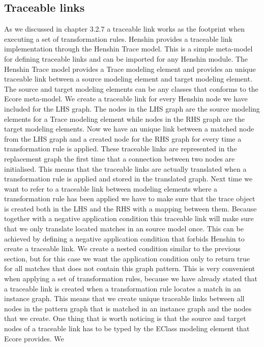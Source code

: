 \subsection{Traceable links}
\label{Trace}

As we discussed in chapter 3.2.7 a traceable link works as the footprint when
executing a set of transformation rules. Henshin provides a traceable link
implementation through the Henshin Trace model. This is a simple meta-model for
defining traceable links and can be imported for any Henshin module. The Henshin
Trace model provides a Trace modeling element and provides an unique traceable
link between a source modeling element and target modeling element. The source
and target modeling elements can be any classes that conforms to the Ecore
meta-model. We create a traceable link for every Henshin node we have included
for the LHS graph. The nodes in the LHS graph are the source modeling elements
for a Trace modeling element while nodes in the RHS graph are the target
modeling elements. Now we have an unique link between a matched node from the
LHS graph and a created node for the RHS graph for every time a transformation
rule is applied. These traceable links are represented in the replacement graph
the first time that a connection between two nodes are initialised. This means
that the traceable links are actually translated when a transformation rule is
applied and stored in the translated graph. Next time we want to refer to
a traceable link between modeling elements where a transformation rule has been
applied we have to make sure that the trace object is created both in the LHS
and the RHS with a mapping between them. Because together with a negative
application condition this traceable link will make sure that we only translate
located matches in an source model once. This can be achieved by defining a
negative application condition that forbids Henshin to create a traceable link.
We create a nested condition similar to the previous section, but for this case
we want the application condition only to return true for all matches that does
not contain this graph pattern. This is very convenient when applying a set of
transformation rules, because we have already stated that a traceable link is
created when a transformation rule locates a match in an instance graph. This
means that we create unique traceable links between all nodes in the pattern
graph that is matched in an instance graph and the nodes that we create. One
thing that is worth noticing is that the source and target nodes of a traceable
link has to be typed by the EClass modeling element that Ecore provides. We
